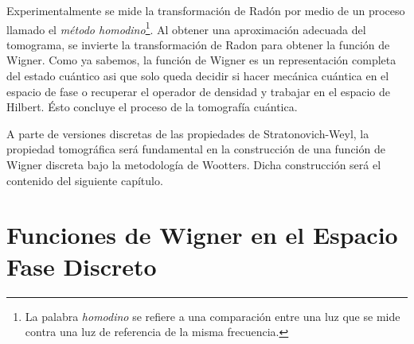 \documentclass[a4paper,11pt]{report}
\begin{document}
  Experimentalmente se mide la transformación de Radón por
  medio de un proceso llamado el \textit{método
    homodino}\footnote{La palabra \textit{homodino} se
  refiere a una comparación entre una luz que se mide contra
  una luz de referencia de la misma frecuencia.}. Al
  obtener una aproximación adecuada del tomograma, se
  invierte la transformación de Radon para obtener la
  función de Wigner.  Como ya sabemos, la función de Wigner
  es un representación completa del estado cuántico asi que
  solo queda decidir si hacer mecánica cuántica en el
  espacio de fase o recuperar el operador de densidad y
  trabajar en el espacio de Hilbert. Ésto concluye el
  proceso de la tomografía cuántica.
  
  A parte de versiones discretas de las propiedades de
  Stratonovich-Weyl, la propiedad tomográfica será
  fundamental en la construcción de una función de Wigner
  discreta bajo la metodología de Wootters. Dicha
  construcción será el contenido del siguiente capítulo.

  \chapter{Funciones de Wigner en el Espacio Fase Discreto}

\end{document}
